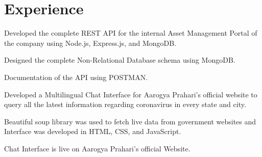 \documentclass[]{deedy-resume-openfont}
\begin{document}
\begin{minipage}[t]{0.34\textwidth}


%
%

\end{minipage} 
\hfill
\begin{minipage}[t]{0.65\textwidth} 


\section{Experience}

\sectionsep

\vspace{\topsep} %
\begin{tightemize}
\item Developed the complete REST API for the internal Asset Management Portal of the company using Node.js, Express.js, and MongoDB.
\item Designed the complete Non-Relational Database schema using MongoDB.
\item Documentation of the API using POSTMAN.
\end{tightemize}
\sectionsep

\begin{tightemize}
\item Developed a Multilingual Chat Interface for Aarogya Prahari's official website to query all the latest information regarding coronavirus in every state and city.
\item Beautiful soup library was used to fetch live data from government websites and Interface was developed in HTML, CSS, and JavaScript.
\item Chat Interface is live on Aarogya Prahari's official Website.
\end{tightemize}
\sectionsep


\end{minipage}
\end{document}
